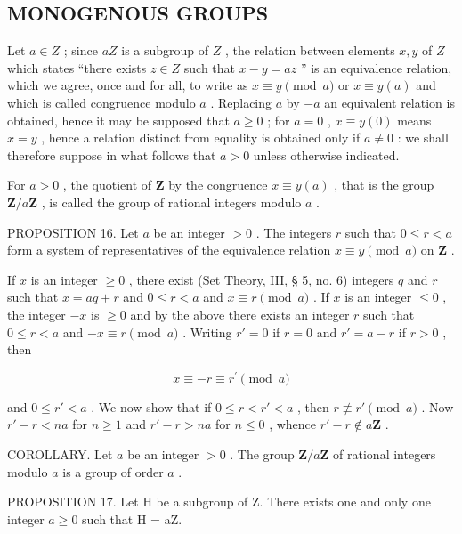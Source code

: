 \subsection{MONOGENOUS GROUPS}

Let \(a \in Z\) ; since \(aZ\) is a subgroup of \(Z\) , the relation between elements \(x, y\) of \(Z\) which states ``there exists \(z \in Z\) such that \(x - y = az\) '' is an equivalence relation, which we agree, once and for all, to write as \(x \equiv y \pmod{a}\) or \(x \equiv y(a)\) and which is called congruence modulo \(a\) . Replacing \(a\) by \(-a\) an equivalent relation is obtained, hence it may be supposed that \(a \geqslant 0\) ; for \(a = 0\) , \(x \equiv y(0)\) means \(x = y\) , hence a relation distinct from equality is obtained only if \(a \neq 0\) : we shall therefore suppose in what follows that \(a > 0\) unless otherwise indicated.

For \(a > 0\) , the quotient of \(\mathbf{Z}\) by the congruence \(x \equiv y(a)\) , that is the group \(\mathbf{Z}/a\mathbf{Z}\) , is called the group of rational integers modulo \(a\) .

PROPOSITION 16. Let \(a\) be an integer \(>0\) . The integers \(r\) such that \(0 \leqslant r < a\) form a system of representatives of the equivalence relation \(x \equiv y \pmod{a}\) on \(\mathbf{Z}\) .

If \(x\) is an integer \(\geqslant 0\) , there exist (Set Theory, III, § 5, no. 6) integers \(q\) and \(r\) such that \(x = aq + r\) and \(0 \leqslant r < a\) and \(x \equiv r \pmod{a}\) . If \(x\) is an integer \(\leqslant 0\) , the integer \(-x\) is \(\geqslant 0\) and by the above there exists an integer \(r\) such that \(0 \leqslant r < a\) and \(-x \equiv r \pmod{a}\) . Writing \(r' = 0\) if \(r = 0\) and \(r' = a - r\) if \(r > 0\) , then

\[
x \equiv - r \equiv r ^ {\prime} \pmod {a}
\]

and \(0 \leqslant r' < a\) . We now show that if \(0 \leqslant r < r' < a\) , then \(r \not\equiv r' \pmod{a}\) . Now \(r' - r < na\) for \(n \geqslant 1\) and \(r' - r > na\) for \(n \leqslant 0\) , whence \(r' - r \notin a\mathbf{Z}\) .

COROLLARY. Let \(a\) be an integer \(> 0\) . The group \(\mathbf{Z} / a\mathbf{Z}\) of rational integers modulo \(a\) is a group of order \(a\) .

PROPOSITION 17. Let H be a subgroup of Z. There exists one and only one integer \(a \geqslant 0\) such that H = aZ.

